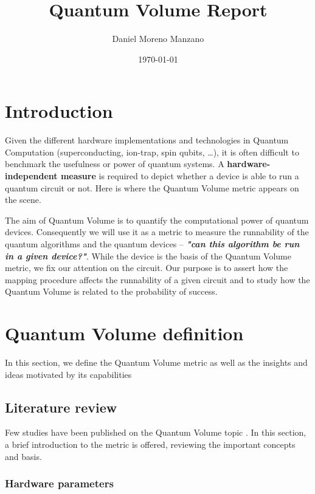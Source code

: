 \documentclass[11pt]{article}
\author{Daniel Moreno Manzano}
\date{\today}
\title{Quantum Volume Report}
\begin{document}
\maketitle

\section{Introduction}
\label{sec:orgcd4ac7e}

Given the different hardware implementations and technologies in Quantum Computation (superconducting, ion-trap, spin qubits, \ldots{}), it is often difficult to benchmark the usefulness or power of quantum systems. 
A \textbf{hardware-independent measure} is required to depict whether a device is able to run a quantum circuit or not.
Here is where the Quantum Volume metric appears on the scene.

The aim of Quantum Volume is to quantify the computational power of quantum devices. 
Consequently we will use it as a metric to measure the runnability of the quantum algorithms and the quantum devices -- \emph{\textbf{"can this algorithm be run in a given device?"}}.
While the device is the basis of the Quantum Volume metric, we fix our attention on the circuit.
Our purpose is to assert how the mapping procedure affects the runnability of a given circuit and to study how the Quantum Volume is related to the probability of success.

\section{Quantum Volume definition}
\label{sec:orgc5a95c3}

In this section, we define the Quantum Volume metric as well as the insights and ideas motivated by its capabilities

\subsection{Literature review}
\label{sec:org0144828}

Few studies have been published on the Quantum Volume topic \cite{Bishop_2017,Moll_2018}.
In this section, a brief introduction to the metric is offered, reviewing the important concepts and basis.

\subsubsection{Hardware parameters}
\label{sec:org951d88d}
\end{document}
